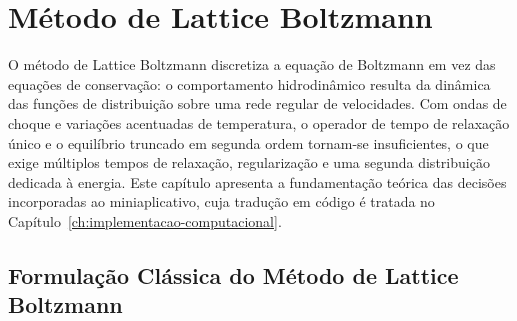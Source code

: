 
\chapter{Método de Lattice Boltzmann}\label{ch:metodo-de-lattice-boltzmann}






O método de Lattice Boltzmann discretiza a equação de Boltzmann em vez das equações de conservação: o comportamento hidrodinâmico resulta da dinâmica das funções de distribuição sobre uma rede regular de velocidades.
Com ondas de choque e variações acentuadas de temperatura, o operador de tempo de relaxação único e o equilíbrio truncado em segunda ordem tornam-se insuficientes, o que exige múltiplos tempos de relaxação, regularização e uma segunda distribuição dedicada à energia.
Este capítulo apresenta a fundamentação teórica das decisões incorporadas ao miniaplicativo, cuja tradução em código é tratada no Capítulo~\ref{ch:implementacao-computacional}.


\section{Formulação Clássica do Método de Lattice Boltzmann}\label{sec:lbm-deducao}

